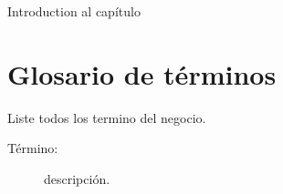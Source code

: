 Introduction al capítulo

\section{Glosario de términos}

Liste todos los termino del negocio.

\begin{description}
	\item[Término: ] descripción.
\end{description}
